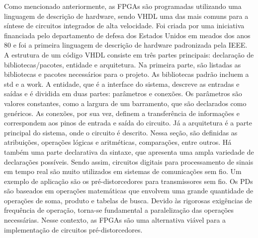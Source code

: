 Como mencionado anteriormente, as FPGAs são programadas utilizando uma linguagem de descrição de hardware, sendo VHDL uma das mais comuns para a síntese de circuitos integrados de alta velocidade. Foi criada por uma iniciativa financiada pelo departamento de defesa dos Estados Unidos em meados dos anos 80 e foi a primeira linguagem de descrição de hardware padronizada pela IEEE.
A estrutura de um código VHDL consiste em três partes principais: declaração de bibliotecas/pacotes, entidade e arquitetura. Na primeira parte, são listadas as bibliotecas e pacotes necessários para o projeto. As bibliotecas padrão incluem a std e a work. A entidade, que é a interface do sistema, descreve as entradas e saídas e é dividida em duas partes: parâmetros e conexões. Os parâmetros são valores constantes, como a largura de um barramento, que são declarados como genéricos. As conexões, por sua vez, definem a transferência de informações e correspondem aos pinos de entrada e saída do circuito. Já a arquitetura é a parte principal do sistema, onde o circuito é descrito. Nessa seção, são definidas as atribuições, operações lógicas e aritméticas, comparações, entre outros. Há também uma parte declarativa da sintaxe, que apresenta uma ampla variedade de declarações possíveis.
Sendo assim, circuitos digitais para processamento de sinais em tempo real são muito utilizados em sistemas de comunicações sem fio. Um exemplo de aplicação são os pré-distorcedores para transmissores sem fio. Os PDs são baseados em operações matemáticas que envolvem uma grande quantidade de operações de soma, produto e tabelas de busca. Devido às rigorosas exigências de frequência de operação, torna-se fundamental a paralelização das operações necessárias. Nesse contexto, as FPGAs são uma alternativa viável para a implementação de circuitos pré-distorcedores.